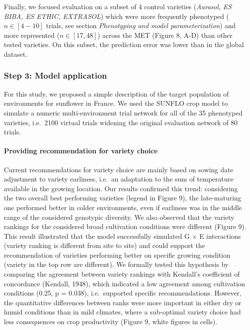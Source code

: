 \documentclass[a4paper]{article}
\let\oldparagraph\paragraph
\renewcommand{\paragraph}[1]{\oldparagraph{#1}\mbox{}}
\begin{document}
Finally, we focused evaluation on a subset of 4 control varieties
(\emph{Aurasol, ES BIBA, ES ETHIC, EXTRASOL}) which were more frequently
phenotyped (\(n \in [4-10]\) trials, see section \emph{Phenotyping and
model parameterization}) and more represented (\(n \in [17, 48]\))
across the MET (Figure 8, A-D) than other tested varieties. On this
subset, the prediction error was lower than in the global dataset.

\subsubsection{Step 3: Model
application}\label{step-3-model-application-1}

For this study, we proposed a simple description of the target
population of environments for sunflower in France. We used the SUNFLO
crop model to simulate a numeric multi-environment trial network for all
of the 35 phenotyped varieties, i.e.~2100 virtual trials widening the
original evaluation network of 80 trials.

\paragraph{Providing recommendation for variety
choice}\label{providing-recommendation-for-variety-choice}

Current recommendations for variety choice are mainly based on sowing
date adjustment to variety earliness, i.e.~an adaptation to the sum of
temperature available in the growing location. Our results confirmed
this trend: considering the two overall best performing varieties
(legend in Figure 9), the late-maturing one performed better in colder
environments, even if earliness was in the middle range of the
considered genotypic diversity. We also observed that the variety
rankings for the considered broad cultivation conditions were different
(Figure 9). This result illustrated that the model successfully
simulated G \(\times\) E interactions (variety ranking is different from
site to site) and could support the recommendation of varieties
performing better on specific growing condition (variety in the top row
are different). We formally tested this hypothesis by comparing the
agreement between variety rankings with Kendall's coefficient of
concordance (Kendall, 1948), which indicated a low agreement among
cultivation conditions (0.25, p = 0.038), i.e.~supported specific
recommendations. However, the quantitative differences between ranks
were more important in either dry or humid conditions than in mild
climates, where a sub-optimal variety choice had less consequences on
crop productivity (Figure 9, white figures in cells).
\end{document}
